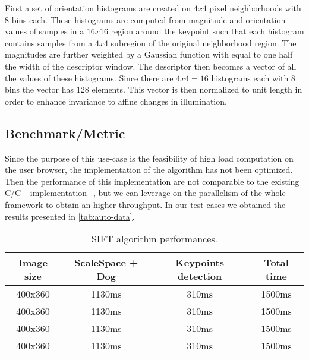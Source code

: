 First a set of orientation histograms are created on $4x4$ pixel neighborhoods
with $8$ bins each. These histograms are computed from magnitude and orientation
values of samples in a $16x16$ region around the keypoint such that each
histogram contains samples from a $4x4$ subregion of the original neighborhood
region. The magnitudes are further weighted by a Gaussian function with equal to
one half the width of the descriptor window. The descriptor then becomes a vector
of all the values of these histograms. Since there are $4x4=16$ histograms each
with $8$ bins the vector has $128$ elements. This vector is then normalized to
unit length in order to enhance invariance to affine changes in illumination.


\subsection{Benchmark/Metric}
Since the purpose of this use-case is the feasibility of high load computation
on the user browser, the implementation of the algorithm has not been optimized.
Then the performance of this implementation are not comparable to the existing
C/C+ implementation+, but we can leverage on the parallelism of the whole
framework to obtain an higher throughput. In our test cases we obtained the
results presented in \autoref{tab:auto-data}.
\begin{table}[htb]
    \caption{\acs{SIFT} algorithm performances.}
    \label{tab:auto-data}
    \centering
    \begin{tabular}{c|c|c|c}
        \textbf{Image size} & \textbf{ScaleSpace + Dog} & \textbf{Keypoints
        detection} & \textbf{Total time}\\
        \hline
        400x360 & 1130ms & 310ms & 1500ms\\
        \hline
        400x360 & 1130ms & 310ms & 1500ms\\
        \hline
        400x360 & 1130ms & 310ms & 1500ms\\
        \hline
        400x360 & 1130ms & 310ms & 1500ms\\
        \hline
    \end{tabular}
\end{table}
